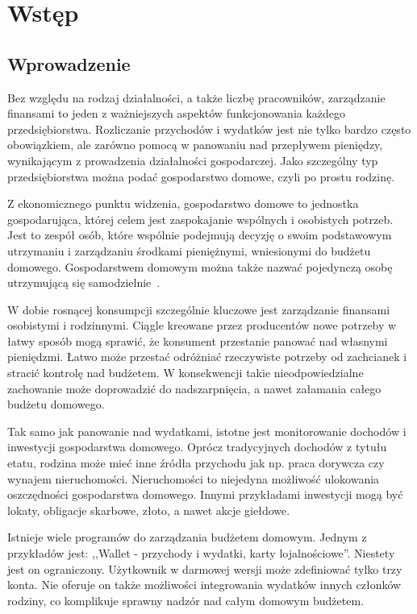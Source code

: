 \chapter{Wstęp}
\label{chap:wstep}
\section{Wprowadzenie}
\label{sec:wprowadzenie}
Bez względu na rodzaj działalności, a także liczbę pracowników, zarządzanie finansami to jeden z ważniejszych aspektów funkcjonowania każdego przedsiębiorstwa. Rozliczanie przychodów i wydatków jest nie tylko bardzo często obowiązkiem, ale zarówno pomocą w panowaniu nad przepływem pieniędzy, wynikającym z prowadzenia działalności gospodarczej. Jako szczególny typ przedsiębiorstwa można podać gospodarstwo domowe, czyli po prostu rodzinę.

Z ekonomicznego punktu widzenia, gospodarstwo domowe to jednostka gospodarująca, której celem jest zaspokajanie wspólnych i osobistych potrzeb. Jest to zespół osób, które wspólnie podejmują decyzję o swoim podstawowym utrzymaniu i zarządzaniu środkami pieniężnymi, wniesionymi do budżetu domowego. Gospodarstwem domowym można także nazwać pojedynczą osobę utrzymującą się samodzielnie~\cite{gospodarstwo-domowe}.

W dobie rosnącej konsumpcji szczególnie kluczowe jest zarządzanie finansami osobistymi i rodzinnymi. Ciągle kreowane przez producentów nowe potrzeby w łatwy sposób mogą sprawić, że konsument przestanie panować nad własnymi pieniędzmi. Łatwo może przestać odróżniać rzeczywiste potrzeby od zachcianek i stracić kontrolę nad budżetem. W konsekwencji takie nieodpowiedzialne zachowanie może doprowadzić do nadszarpnięcia, a nawet załamania całego budżetu domowego.

Tak samo jak panowanie nad wydatkami, istotne jest monitorowanie dochodów i inwestycji gospodarstwa domowego. Oprócz tradycyjnych dochodów z tytułu etatu, rodzina może mieć inne źródła przychodu jak np. praca dorywcza czy wynajem nieruchomości. Nieruchomości to niejedyna możliwość ulokowania oszczędności gospodarstwa domowego. Innymi przykładami inwestycji mogą być lokaty, obligacje skarbowe, złoto, a nawet akcje giełdowe.

Istnieje wiele programów do zarządzania budżetem domowym. Jednym z przykładów jest: ,,Wallet - przychody i wydatki, karty lojalnościowe''. Niestety jest on ograniczony. Użytkownik w darmowej wersji może zdefiniować tylko trzy konta. Nie oferuje on także możliwości integrowania wydatków innych członków rodziny, co komplikuje sprawny nadzór nad całym domowym budżetem.


